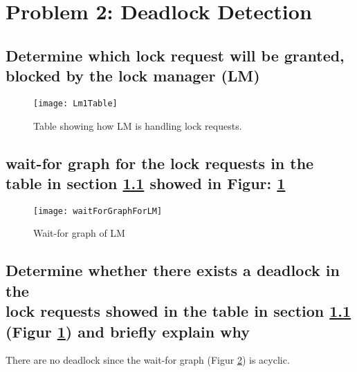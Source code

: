 \section{Problem 2: Deadlock Detection}
\subsection{Determine which lock request will be granted, blocked by the lock manager (LM)} \label{lmsection}
\begin{figure}[H]
\centering
\texttt{[image: Lm1Table]}
\caption[Table showing how LM is handling locks]{Table showing how LM is handling lock requests.}
\label{fig:LmTable}
\end{figure}
\pagebreak
\subsection{wait-for graph for the lock requests in the table in section \ref{lmsection} showed in Figur: \ref{fig:LmTable}}
	
\begin{figure}[H]
\centering
\texttt{[image: waitForGraphForLM]}
\caption[Wait-for graph of LM]{}
\caption{Wait-for graph of LM}
\label{fig:waitForGraphForLM}
\end{figure}
\pagebreak
\subsection{Determine whether there exists a deadlock in the \\lock requests showed in the table in section \ref{lmsection} (Figur \ref{fig:LmTable}) and briefly explain why}
There are no deadlock since the wait-for graph (Figur \ref{fig:waitForGraphForLM}) is acyclic.
